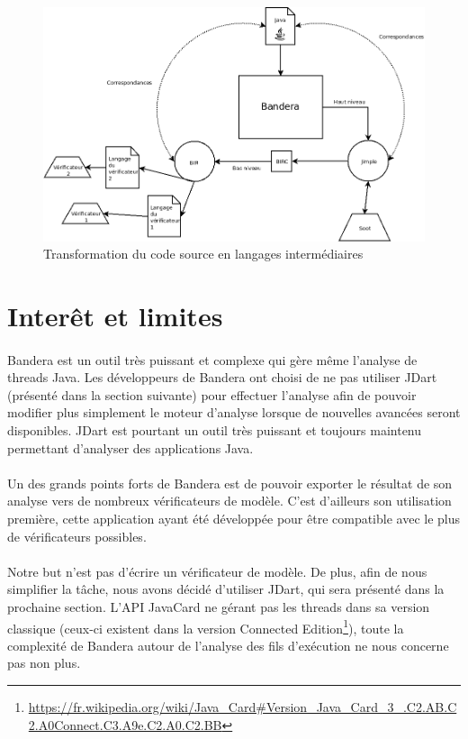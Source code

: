 \begin{figure}[H]
  \centering
  \includegraphics[scale=0.5]{images/bandera_bir_jimple.png}
  \caption{\label{fig:bir_jimple} Transformation du code source en
    langages intermédiaires}
\end{figure}

\section{Interêt et limites}

\paragraph{}
Bandera est un outil très puissant et complexe qui gère même l'analyse
de threads Java. Les développeurs de Bandera ont choisi de ne pas
utiliser JDart (présenté dans la section suivante) pour effectuer
l'analyse afin de pouvoir modifier plus simplement le moteur d'analyse
lorsque de nouvelles avancées seront disponibles. JDart est pourtant
un outil très puissant et toujours maintenu permettant d'analyser des
applications Java.

\paragraph{}
Un des grands points forts de Bandera est de pouvoir exporter le
résultat de son analyse vers de nombreux vérificateurs de
modèle. C'est d'ailleurs son utilisation première, cette application
ayant été développée pour être compatible avec le plus de
vérificateurs possibles.

\paragraph{}
Notre but n'est pas d'écrire un vérificateur de modèle. De plus, afin
de nous simplifier la tâche, nous avons décidé d'utiliser JDart, qui
sera présenté dans la prochaine section. L'API JavaCard ne gérant pas
les threads dans sa version classique (ceux-ci existent dans la
version Connected
Edition\footnote{\url{https://fr.wikipedia.org/wiki/Java_Card\#Version_Java_Card_3_.C2.AB.C2.A0Connect.C3.A9e.C2.A0.C2.BB}}),
toute la complexité de Bandera autour de l'analyse des fils
d'exécution ne nous concerne pas non plus.

